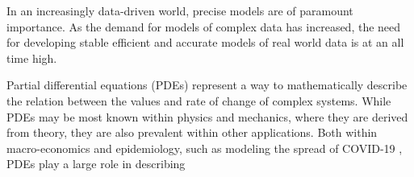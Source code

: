 In an increasingly data-driven world, precise models are of paramount importance.
As the demand for models of complex data has increased, the need for developing stable efficient and accurate models of real world data is at an all time high.

Partial differential equations (PDEs) represent a way to mathematically describe the relation between the values and rate of change of complex systems.
While PDEs may be most known within physics and mechanics, where they are derived from theory, they are also prevalent within other applications.
Both within macro-economics \cite{ecoPDE} and epidemiology, such as modeling the spread of COVID-19 \cite{covidus}, PDEs play a large role in describing 





